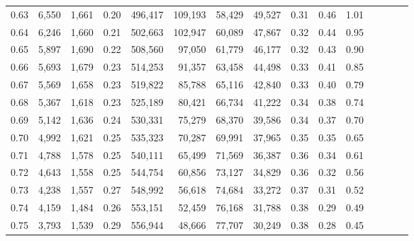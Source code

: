 \begin{tabular}{rrrcrrrrrrrrrrr}
0.63 &   6,550 &  1,661 &                                       0.20 &  496,417 &  109,193 &   58,429 &   49,527 &  0.31 &  0.46 &                         1.01 \\
0.64 &   6,246 &  1,660 &                                       0.21 &  502,663 &  102,947 &   60,089 &   47,867 &  0.32 &  0.44 &                         0.95 \\
0.65 &   5,897 &  1,690 &                                       0.22 &  508,560 &   97,050 &   61,779 &   46,177 &  0.32 &  0.43 &                         0.90 \\
0.66 &   5,693 &  1,679 &                                       0.23 &  514,253 &   91,357 &   63,458 &   44,498 &  0.33 &  0.41 &                         0.85 \\
0.67 &   5,569 &  1,658 &                                       0.23 &  519,822 &   85,788 &   65,116 &   42,840 &  0.33 &  0.40 &                         0.79 \\
0.68 &   5,367 &  1,618 &                                       0.23 &  525,189 &   80,421 &   66,734 &   41,222 &  0.34 &  0.38 &                         0.74 \\
0.69 &   5,142 &  1,636 &                                       0.24 &  530,331 &   75,279 &   68,370 &   39,586 &  0.34 &  0.37 &                         0.70 \\
0.70 &   4,992 &  1,621 &                                       0.25 &  535,323 &   70,287 &   69,991 &   37,965 &  0.35 &  0.35 &                         0.65 \\
0.71 &   4,788 &  1,578 &                                       0.25 &  540,111 &   65,499 &   71,569 &   36,387 &  0.36 &  0.34 &                         0.61 \\
0.72 &   4,643 &  1,558 &                                       0.25 &  544,754 &   60,856 &   73,127 &   34,829 &  0.36 &  0.32 &                         0.56 \\
0.73 &   4,238 &  1,557 &                                       0.27 &  548,992 &   56,618 &   74,684 &   33,272 &  0.37 &  0.31 &                         0.52 \\
0.74 &   4,159 &  1,484 &                                       0.26 &  553,151 &   52,459 &   76,168 &   31,788 &  0.38 &  0.29 &                         0.49 \\
0.75 &   3,793 &  1,539 &                                       0.29 &  556,944 &   48,666 &   77,707 &   30,249 &  0.38 &  0.28 &                         0.45 \\

\end{tabular}
